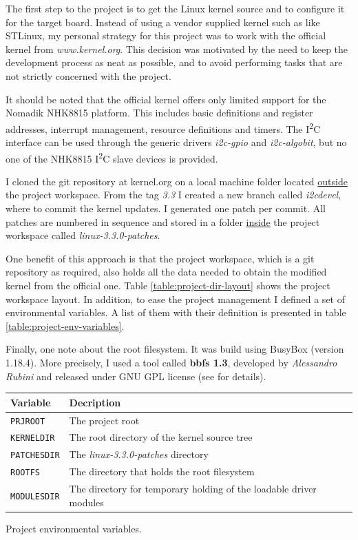 \documentclass[a4paper,10pt]{article}
\makeatletter
\newenvironment{tablehere}{\def\@captype{table}}{}
\newcommand{\icc}{I\textsuperscript{2}C }
\makeatother
\begin{document}
\begin{multicols}{2}
The first step to the project is to get the Linux kernel source and to configure
it for the target board. Instead of  using a vendor supplied kernel such as like
STLinux, my personal strategy for this project was to work with the official
kernel from \emph{www.kernel.org}.
This decision was motivated by the need to keep the development process as neat
as possible, and to avoid performing tasks that are not strictly concerned with
the project.

It should be noted that the official kernel offers only limited support for the
Nomadik  NHK8815 platform.
This includes basic definitions and register addresses, interrupt management,
resource definitions and timers. The \icc interface can be used through the
generic drivers \emph{i2c-gpio} and \emph{i2c-algobit}, but no one of the NHK8815
\icc slave devices is provided.

I cloned the git repository at kernel.org on a local machine folder
located \underline{outside} the project workspace. From the tag \emph{3.3}
I created a new branch called \emph{i2cdevel}, where to commit the kernel updates.
I generated one patch per commit. All patches are numbered in sequence and
stored in a folder \underline{inside} the project workspace called
\emph{linux-3.3.0-patches}.

One benefit of this approach is that the project workspace, which is a git
repository as required, also holds all the data needed to obtain the modified
kernel from the official one.
Table \ref{table:project-dir-layout} shows the project workspace layout.
In addition, to ease the project management I defined a set of environmental
variables. A list of them with their definition is presented in table
\ref{table:project-env-variables}.

Finally, one note about the root filesystem. It was build using BusyBox
(version 1.18.4). More precisely, I used a tool called \textbf{bbfs 1.3}, 
developed by \emph{Alessandro Rubini} and released under GNU GPL license
(see \cite{bbfs1.3} for details).\\

\begin{tablehere}
	\centering
	\renewcommand{\arraystretch}{1.2}	
	\begin{tabular}{l p{5cm}}
		\hline
		Variable & Decription \\
		\hline
		\texttt{PRJROOT} & The project root \\
		\texttt{KERNELDIR} & The root directory of the kernel source tree \\
		\texttt{PATCHESDIR} & The \emph{linux-3.3.0-patches} directory \\
		\texttt{ROOTFS} & The directory that holds the root filesystem \\
		\texttt{MODULESDIR} & The directory for temporary holding of the
			loadable driver modules \\
		\hline
	\end{tabular}
	\caption{Project environmental variables.}
	\label{table:project-env-variables}
\end{tablehere}



\end{multicols}
\end{document}
